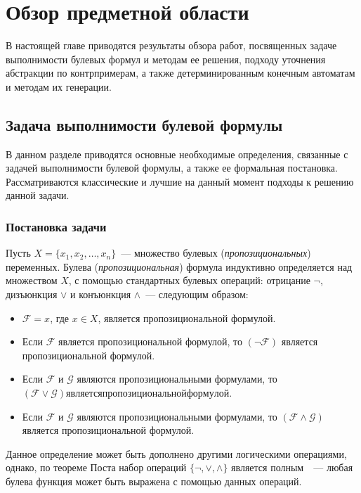 
\chapter{Обзор предметной области} 
\label{sec:review}

В настоящей главе приводятся результаты обзора работ, посвященных задаче выполнимости булевых формул и методам ее решения, подходу уточнения абстракции по контрпримерам, а также детерминированным конечным автоматам и методам их генерации.

\section{Задача выполнимости булевой формулы}
\label{sec:review:sat}

В данном разделе приводятся основные необходимые определения, связанные с задачей выполнимости булевой формулы, а также ее формальная постановка.
Рассматриваются классические и лучшие на данный момент подходы к решению данной задачи.


\subsection{Постановка задачи}
\label{sec:review:sat:problem}

Пусть $X = \{x_{1},x_{2},\ldots,x_{n}\}$~--- множество булевых (\emph{пропозициональных}) переменных.
Булева (\emph{пропозициональная}) формула индуктивно определяется над множеством $X$, с помощью стандартных булевых операций: отрицание $\neg$, дизъюнкция $\vee$ и конъюнкция $\wedge$~--- следующим образом:
\begin{itemize}
   \item $\mathcal{F} = x$, где $x \in X$, является пропозициональной формулой.
   \item Если $\mathcal{F}$ является пропозициональной формулой, то $\left(\neg \mathcal{F}\right)$ является пропозициональной формулой. 
   \item Если $\mathcal{F}$ и $\mathcal{G}$ являются пропозициональными формулами, то $\left(\mathcal{F} \vee \mathcal{G}\right) является пропозициональной формулой.$
   \item Если $\mathcal{F}$ и $\mathcal{G}$ являются пропозициональными формулами, то $\left(\mathcal{F} \wedge \mathcal{G}\right)$ является пропозициональной формулой.
\end{itemize} 
Данное определение может быть дополнено другими логическими операциями, однако, по теореме Поста набор операций $\{\neg, \vee, \wedge\}$ является полным~\cite{post-theorem41}~--- любая булева функция может быть выражена с помощью данных операций.

